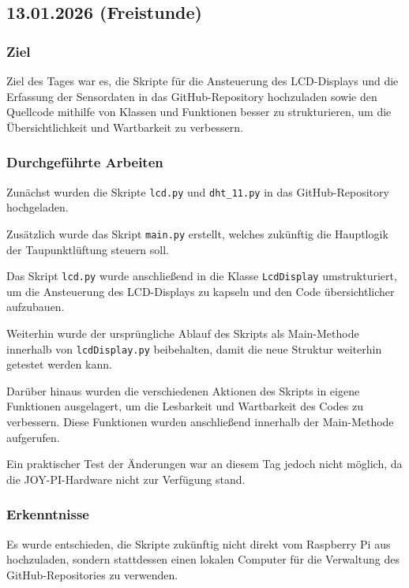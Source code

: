 \subsection{13.01.2026 (Freistunde)}

\subsubsection{Ziel}

Ziel des Tages war es, die Skripte für die Ansteuerung des LCD-Displays
und die Erfassung der Sensordaten in das GitHub-Repository hochzuladen
sowie den Quellcode mithilfe von Klassen und Funktionen besser zu
strukturieren, um die Übersichtlichkeit und Wartbarkeit zu verbessern.

\subsubsection{Durchgeführte Arbeiten}

Zunächst wurden die Skripte \texttt{lcd.py} und
\texttt{dht\_11.py} in das GitHub-Repository hochgeladen.

Zusätzlich wurde das Skript \texttt{main.py} erstellt, welches
zukünftig die Hauptlogik der Taupunktlüftung steuern soll.

Das Skript \texttt{lcd.py} wurde anschließend in die Klasse
\texttt{LcdDisplay} umstrukturiert, um die Ansteuerung des
LCD-Displays zu kapseln und den Code übersichtlicher aufzubauen.

Weiterhin wurde der ursprüngliche Ablauf des Skripts als
Main-Methode innerhalb von \texttt{lcdDisplay.py} beibehalten,
damit die neue Struktur weiterhin getestet werden kann.

Darüber hinaus wurden die verschiedenen Aktionen des Skripts in
eigene Funktionen ausgelagert, um die Lesbarkeit und Wartbarkeit
des Codes zu verbessern. Diese Funktionen wurden anschließend
innerhalb der Main-Methode aufgerufen.

Ein praktischer Test der Änderungen war an diesem Tag jedoch nicht
möglich, da die JOY-PI-Hardware nicht zur Verfügung stand.

\subsubsection{Erkenntnisse}

Es wurde entschieden, die Skripte zukünftig nicht direkt vom
Raspberry Pi aus hochzuladen, sondern stattdessen einen lokalen
Computer für die Verwaltung des GitHub-Repositories zu verwenden.

